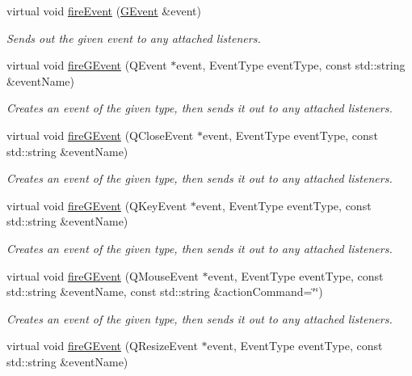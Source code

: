 \begin{DoxyCompactItemize}
virtual void \mbox{\hyperlink{classGObservable_a63e5e5a6227c59c928493b11aceb0f67}{fire\+Event}} (\mbox{\hyperlink{classGEvent}{G\+Event}} \&event)
\begin{DoxyCompactList}\small\item\em Sends out the given event to any attached listeners. \end{DoxyCompactList}\item 
virtual void \mbox{\hyperlink{classGObservable_ab3983ea07337b52020a29cc00c653d8d}{fire\+G\+Event}} (Q\+Event $\ast$event, Event\+Type event\+Type, const std\+::string \&event\+Name)
\begin{DoxyCompactList}\small\item\em Creates an event of the given type, then sends it out to any attached listeners. \end{DoxyCompactList}\item 
virtual void \mbox{\hyperlink{classGObservable_a01fdf1b0e0dbd49e189fe4514e010411}{fire\+G\+Event}} (Q\+Close\+Event $\ast$event, Event\+Type event\+Type, const std\+::string \&event\+Name)
\begin{DoxyCompactList}\small\item\em Creates an event of the given type, then sends it out to any attached listeners. \end{DoxyCompactList}\item 
virtual void \mbox{\hyperlink{classGObservable_abb0b2f66ba39211cb5d7615e9d1c04e2}{fire\+G\+Event}} (Q\+Key\+Event $\ast$event, Event\+Type event\+Type, const std\+::string \&event\+Name)
\begin{DoxyCompactList}\small\item\em Creates an event of the given type, then sends it out to any attached listeners. \end{DoxyCompactList}\item 
virtual void \mbox{\hyperlink{classGObservable_a119318675d2165bdf7dd853aaf881d4b}{fire\+G\+Event}} (Q\+Mouse\+Event $\ast$event, Event\+Type event\+Type, const std\+::string \&event\+Name, const std\+::string \&action\+Command=\char`\"{}\char`\"{})
\begin{DoxyCompactList}\small\item\em Creates an event of the given type, then sends it out to any attached listeners. \end{DoxyCompactList}\item 
virtual void \mbox{\hyperlink{classGObservable_a63fd9034e1e1633c1c38eb342bfd34e9}{fire\+G\+Event}} (Q\+Resize\+Event $\ast$event, Event\+Type event\+Type, const std\+::string \&event\+Name)

\end{DoxyCompactItemize}
